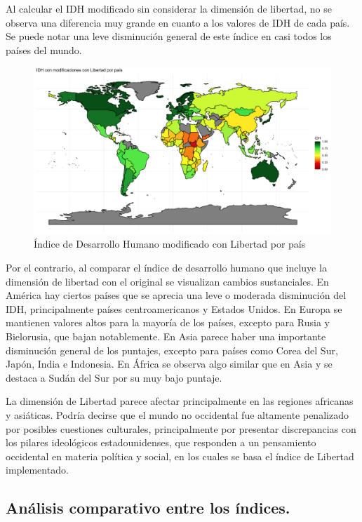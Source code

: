 \documentclass[
  10pt,
]{article}
\begin{document}
Al calcular el IDH modificado sin considerar la dimensión de libertad,
no se observa una diferencia muy grande en cuanto a los valores de IDH
de cada país. Se puede notar una leve disminución general de este índice
en casi todos los países del mundo.

\begin{figure}

{\centering \includegraphics[width=1\linewidth]{Resultados/mapa_IDH3} 

}

\caption{Índice de Desarrollo Humano modificado con Libertad por país}\label{fig:mapa3}
\end{figure}

Por el contrario, al comparar el índice de desarrollo humano que incluye
la dimensión de libertad con el original se visualizan cambios
sustanciales. En América hay ciertos países que se aprecia una leve o
moderada disminución del IDH, principalmente países centroamericanos y
Estados Unidos. En Europa se mantienen valores altos para la mayoría de
los países, excepto para Rusia y Bielorusia, que bajan notablemente. En
Asia parece haber una importante disminución general de los puntajes,
excepto para países como Corea del Sur, Japón, India e Indonesia. En
África se observa algo similar que en Asia y se destaca a Sudán del Sur
por su muy bajo puntaje.

La dimensión de Libertad parece afectar principalmente en las regiones
africanas y asiáticas. Podría decirse que el mundo no occidental fue
altamente penalizado por posibles cuestiones culturales, principalmente
por presentar discrepancias con los pilares ideológicos estadounidenses,
que responden a un pensamiento occidental en materia política y social,
en los cuales se basa el índice de Libertad implementado.

\subsection{Análisis comparativo entre los
índices.}\label{anuxe1lisis-comparativo-entre-los-uxedndices.}
\end{document}
